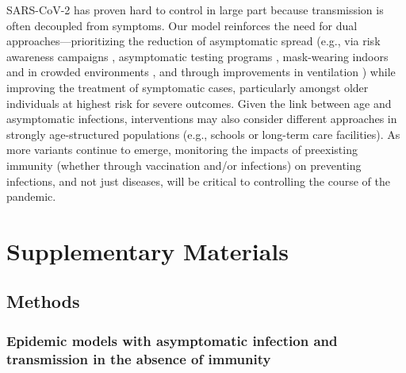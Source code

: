 \documentclass[12pt]{article}
\begin{document}
SARS-CoV-2 has proven hard to control in large part because transmission is often decoupled from symptoms. 
Our model reinforces the need for dual approaches---prioritizing the reduction of asymptomatic spread (e.g., via risk awareness campaigns \citep{chande2020real,sinclair2021pairing}, asymptomatic testing programs \citep{mina2021covid,gibson2022surv}, mask-wearing indoors and in crowded environments \citep{jones2020two,prather2020reducing,howard2021ev}, and through improvements in ventilation \citep{allen2021indoor,wang2021airborne}) while improving the treatment of symptomatic cases, particularly amongst older individuals at highest risk for severe outcomes. 
Given the link between age and asymptomatic infections, interventions may also consider different approaches in strongly age-structured populations (e.g., schools or long-term care facilities).
As more variants continue to emerge, monitoring the impacts of preexisting immunity (whether through vaccination and/or infections) on preventing infections, and not just diseases, will be critical to controlling the course of the pandemic.

\pagebreak

\section*{Supplementary Materials}
\setcounter{figure}{0}
\renewcommand{\thefigure}{S\arabic{figure}}

\subsection*{Methods}

\subsubsection*{Epidemic models with asymptomatic infection and transmission in the absence of immunity}
\end{document}
